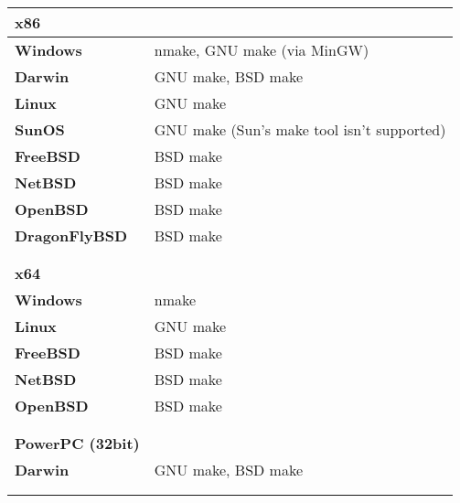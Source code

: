 \begin{tabular}{l l}
{\bf{\large x86}} &                                            \\
\hline\hline
{\bf Windows}      & nmake, GNU make (via MinGW)               \\
{\bf Darwin}       & GNU make, BSD make                        \\
{\bf Linux}        & GNU make                                  \\
{\bf SunOS}        & GNU make (Sun's make tool isn't supported)\\
{\bf FreeBSD}      & BSD make                                  \\
{\bf NetBSD}       & BSD make                                  \\
{\bf OpenBSD}      & BSD make                                  \\
{\bf DragonFlyBSD} & BSD make                                  \\
\hline
                   &                                           \\
                   &                                           \\


{\bf{\large x64}}  &                                           \\
\hline\hline
{\bf Windows}      & nmake                                     \\
{\bf Linux}        & GNU make                                  \\
{\bf FreeBSD}      & BSD make                                  \\
{\bf NetBSD}       & BSD make                                  \\
{\bf OpenBSD}      & BSD make                                  \\
\hline
                   &                                           \\
                   &                                           \\


{\bf{\large PowerPC (32bit)}} &                                \\
\hline\hline
{\bf Darwin}                  & GNU make, BSD make             \\
\hline
                   &                                           \\
                   &                                           \\



\end{tabular}

